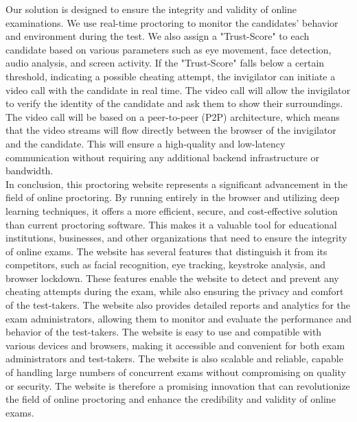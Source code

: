 \documentclass[journal]{IEEEtran}
\begin{document}
Our solution is designed to ensure the integrity and validity of online examinations. We use real-time proctoring to monitor the candidates' behavior and environment during the test. We also assign a "Trust-Score" to each candidate based on various parameters such as eye movement, face detection, audio analysis, and screen activity. If the "Trust-Score" falls below a certain threshold, indicating a possible cheating attempt, the invigilator can initiate a video call with the candidate in real time. The video call will allow the invigilator to verify the identity of the candidate and ask them to show their surroundings. The video call will be based on a peer-to-peer (P2P) architecture, which means that the video streams will flow directly between the browser of the invigilator and the candidate. This will ensure a high-quality and low-latency communication without requiring any additional backend infrastructure or bandwidth. \\

In conclusion, this proctoring website represents a significant advancement in the field of online proctoring. By running entirely in the browser and utilizing deep learning techniques, it offers a more efficient, secure, and cost-effective solution than current proctoring software. This makes it a valuable tool for educational institutions, businesses, and other organizations that need to ensure the integrity of online exams. The website has several features that distinguish it from its competitors, such as facial recognition, eye tracking, keystroke analysis, and browser lockdown. These features enable the website to detect and prevent any cheating attempts during the exam, while also ensuring the privacy and comfort of the test-takers. The website also provides detailed reports and analytics for the exam administrators, allowing them to monitor and evaluate the performance and behavior of the test-takers. The website is easy to use and compatible with various devices and browsers, making it accessible and convenient for both exam administrators and test-takers. The website is also scalable and reliable, capable of handling large numbers of concurrent exams without compromising on quality or security. The website is therefore a promising innovation that can revolutionize the field of online proctoring and enhance the credibility and validity of online exams.
\end{document}

